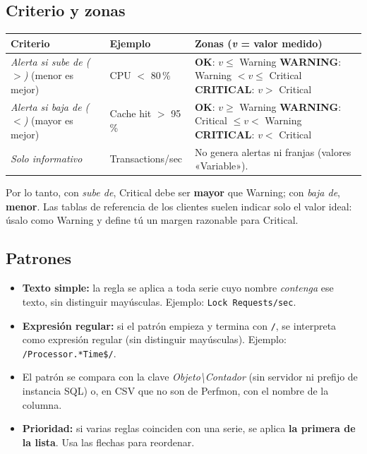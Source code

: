 \documentclass[11pt,a4paper,oneside]{report}
\newcommand{\bs}{\textbackslash}
\newcommand{\warnz}{\textsf{\textbf{\color{warnc}WARNING}}}
\newcommand{\critz}{\textsf{\textbf{\color{critc}CRITICAL}}}
\newcommand{\okz}{\textsf{\textbf{\color{okc}OK}}}
\begin{document}
\subsection{Criterio y zonas}

\begin{center}
\begin{tabularx}{\textwidth}{L{3.3cm}L{2.9cm}X}
  \toprule
  Criterio & Ejemplo & Zonas (\emph{v} = valor medido) \\
  \midrule
  \emph{Alerta si sube de ($>$)} \newline (menor es mejor) &
    CPU $<$ 80\,\% &
    \okz: $v \le$ Warning \newline
    \warnz: Warning $< v \le$ Critical \newline
    \critz: $v >$ Critical \\
  \addlinespace
  \emph{Alerta si baja de ($<$)} \newline (mayor es mejor) &
    Cache hit $>$ 95\,\% &
    \okz: $v \ge$ Warning \newline
    \warnz: Critical $\le v <$ Warning \newline
    \critz: $v <$ Critical \\
  \addlinespace
  \emph{Solo informativo} &
    Transactions/sec &
    No genera alertas ni franjas (valores «Variable»). \\
  \bottomrule
\end{tabularx}
\end{center}

Por lo tanto, con \emph{sube de}, Critical debe ser \textbf{mayor} que
Warning; con \emph{baja de}, \textbf{menor}. Las tablas de referencia de los
clientes suelen indicar solo el valor ideal: úsalo como Warning y define tú
un margen razonable para Critical.

\subsection{Patrones}

\begin{itemize}
  \item \textbf{Texto simple:} la regla se aplica a toda serie cuyo nombre
        \emph{contenga} ese texto, sin distinguir mayúsculas. Ejemplo:
        \texttt{Lock Requests/sec}.
  \item \textbf{Expresión regular:} si el patrón empieza y termina con
        \texttt{/}, se interpreta como expresión regular (sin distinguir
        mayúsculas). Ejemplo: \texttt{/Processor.*Time\$/}.
  \item El patrón se compara con la clave \emph{Objeto\bs Contador} (sin
        servidor ni prefijo de instancia SQL) o, en CSV que no son de Perfmon,
        con el nombre de la columna.
  \item \textbf{Prioridad:} si varias reglas coinciden con una serie, se aplica
        \textbf{la primera de la lista}. Usa las flechas para reordenar.
\end{itemize}
\end{document}
